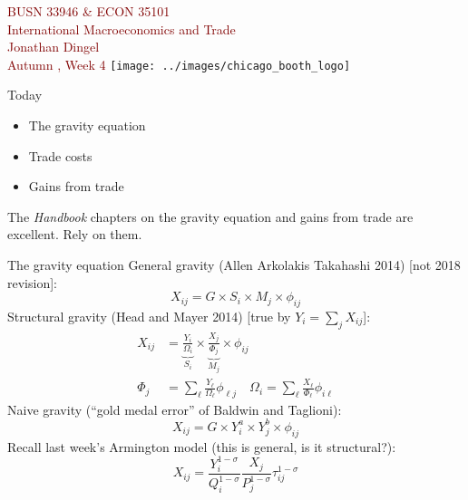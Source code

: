 \documentclass[10pt,notes=hide]{beamer}
\begin{document}
\begin{frame}[plain]
\begin{center}
\large
\textcolor{maroon}{BUSN 33946 \& ECON 35101\\
International Macroeconomics and Trade\\ 
Jonathan Dingel\\
Autumn \the\year, Week 4}
\vfill 
\texttt{[image: ../images/chicago\_booth\_logo]}
\end{center}
\end{frame}
\begin{frame}{Today}
\begin{itemize}
	\item The gravity equation
	\item Trade costs
	\item Gains from trade
\end{itemize}
The \textit{Handbook} chapters on the gravity equation and gains from trade are excellent.
Rely on them.
\end{frame}
\begin{frame}{The gravity equation}
General gravity (Allen Arkolakis Takahashi 2014) [not 2018 revision]:
\begin{equation*}
X_{ij} = G \times S_i \times M_j \times \phi_{ij}
\end{equation*}
Structural gravity (Head and Mayer 2014) [true by $Y_i = \sum_j X_{ij}$]:
\begin{align*}
X_{ij} &= \underbrace{\frac{Y_i}{\Omega_i}}_{S_i} \times \underbrace{\frac{X_j}{\Phi_j}}_{M_j} \times \phi_{ij}\\
\Phi_j  &= \sum_{\ell} \frac{Y_{\ell}}{\Omega_{\ell}} \phi_{\ell j}
\quad \Omega_i = \sum_{\ell} \frac{X_{\ell}}{\Phi_{\ell}} \phi_{i \ell}
\end{align*}
Naive gravity (``gold medal error'' of Baldwin and Taglioni):
\begin{equation*}
X_{ij} = G \times Y_i^a \times Y_j^b \times \phi_{ij}
\end{equation*}
Recall last week's Armington model (this is general, is it structural?):
\begin{equation*}
X_{ij}	= \frac{Y_i^{1-\sigma}}{Q_i^{1-\sigma}} \frac{X_j}{P_j^{1-\sigma}}\tau_{ij}^{1-\sigma}
\end{equation*}
\end{frame}
\end{document}
